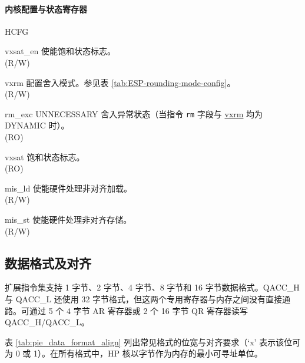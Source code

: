 \documentclass[main\_\_CN.tex]{subfiles}
\begin{document}
\paragraph{内核配置与状态寄存器}

\begin{register}{H}{CFG}{}\label{regdesc:ESPCFG}
%
%
%
%
%
%
%
\regnewline%
\begin{regdesc}\begin{reglist}
\label{vxsat_en}\item [vxsat\_en] 使能饱和状态标志。\\
(R/W)
\label{vxrm}\item [vxrm] 配置舍入模式。参见表 \ref{tab:ESP-rounding-mode-config}。\\
(R/W)
\label{rm_exc}\item [rm\_exc] UNNECESSARY 舍入异常状态（当指令 \lstinline{rm} 字段与 \hyperref[vxrm]{vxrm} 均为 DYNAMIC 时）。\\
(RO)
\label{vxsat}\item [vxsat] 饱和状态标志。\\
(RO)
\label{mis_ld}\item [mis\_ld] 使能硬件处理非对齐加载。\\
(R/W)
\label{mis_st}\item [mis\_st] 使能硬件处理非对齐存储。\\ (R/W)
\end{reglist}\end{regdesc}
\end{register}








\subsection{数据格式及对齐}
\label{sec:pie-data-align}

扩展指令集支持 1 字节、2 字节、4 字节、8 字节和 16 字节数据格式。QACC\_H 与 QACC\_L 还使用 32 字节格式，但这两个专用寄存器与内存之间没有直接通路。可通过 5 个 4 字节 AR 寄存器或 2 个 16 字节 QR 寄存器读写 QACC\_H/QACC\_L。

表 \ref{tab:pie_data_format_align} 列出常见格式的位宽与对齐要求（`x' 表示该位可为 0 或 1）。在所有格式中，HP 核以字节作为内存的最小可寻址单位。
\end{document}
